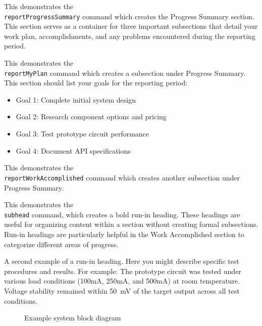 \documentclass[titlecase]{capstone_report}
\begin{document}
\reportProgressSummary
This demonstrates the \texttt{\\reportProgressSummary} command which creates the Progress Summary section. This section serves as a container for three important subsections that detail your work plan, accomplishments, and any problems encountered during the reporting period.

\reportMyPlan
This demonstrates the \texttt{\\reportMyPlan} command which creates a subsection under Progress Summary. This section should list your goals for the reporting period:

\begin{itemize}
    \item Goal 1: Complete initial system design
    \item Goal 2: Research component options and pricing
    \item Goal 3: Test prototype circuit performance
    \item Goal 4: Document API specifications
\end{itemize}

\reportWorkAccomplished
This demonstrates the \texttt{\\reportWorkAccomplished} command which creates another subsection under Progress Summary.

 This demonstrates the \texttt{\\subhead} command, which creates a bold run-in heading. These headings are useful for organizing content within a section without creating formal subsections. Run-in headings are particularly helpful in the Work Accomplished section to categorize different areas of progress.

 A second example of a run-in heading. Here you might describe specific test procedures and results. For example: The prototype circuit was tested under various load conditions (100mA, 250mA, and 500mA) at room temperature. Voltage stability remained within \SI{50}{\milli\volt} of the target output across all test conditions.

\begin{figure}[htb]
    \centering
    \caption{Example system block diagram}
    \label{fig:example}
\end{figure}
\end{document}
